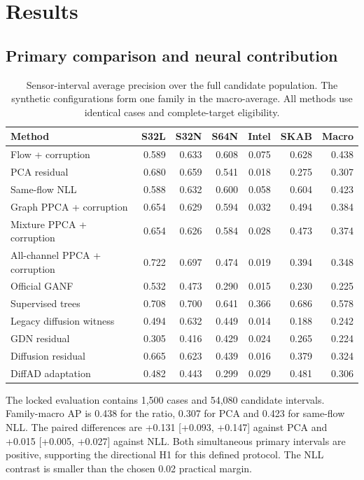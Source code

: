 \documentclass[conference]{IEEEtran}
\newcommand{\1}{\mathbf{1}}
\begin{document}
\section{Results}
\subsection{Primary comparison and neural contribution}
\begin{table}[t]
\centering
\caption{Sensor-interval average precision over the full candidate population. The synthetic configurations form one family in the macro-average. All methods use identical cases and complete-target eligibility.}
\label{tab:ap}
\small
\begin{tabular}{lrrrrrr}
\toprule
Method & S32L & S32N & S64N & Intel & SKAB & Macro \\
\midrule
Flow + corruption & 0.589 & 0.633 & 0.608 & 0.075 & 0.628 & 0.438 \\
PCA residual & 0.680 & 0.659 & 0.541 & 0.018 & 0.275 & 0.307 \\
Same-flow NLL & 0.588 & 0.632 & 0.600 & 0.058 & 0.604 & 0.423 \\
Graph PPCA + corruption & 0.654 & 0.629 & 0.594 & 0.032 & 0.494 & 0.384 \\
Mixture PPCA + corruption & 0.654 & 0.626 & 0.584 & 0.028 & 0.473 & 0.374 \\
All-channel PPCA + corruption & 0.722 & 0.697 & 0.474 & 0.019 & 0.394 & 0.348 \\
Official GANF & 0.532 & 0.473 & 0.290 & 0.015 & 0.230 & 0.225 \\
Supervised trees & 0.708 & 0.700 & 0.641 & 0.366 & 0.686 & 0.578 \\
Legacy diffusion witness & 0.494 & 0.632 & 0.449 & 0.014 & 0.188 & 0.242 \\
GDN residual & 0.305 & 0.416 & 0.429 & 0.024 & 0.265 & 0.224 \\
Diffusion residual & 0.665 & 0.623 & 0.439 & 0.016 & 0.379 & 0.324 \\
DiffAD adaptation & 0.482 & 0.443 & 0.299 & 0.029 & 0.481 & 0.306 \\
\bottomrule
\end{tabular}
\end{table}
The locked evaluation contains 1,500 cases and 54,080 candidate intervals. Family-macro AP is 0.438 for the ratio, 0.307 for PCA and 0.423 for same-flow NLL. The paired differences are +0.131 [+0.093, +0.147] against PCA and +0.015 [+0.005, +0.027] against NLL. Both simultaneous primary intervals are positive, supporting the directional H1 for this defined protocol. The NLL contrast is smaller than the chosen 0.02 practical margin.
\end{document}
